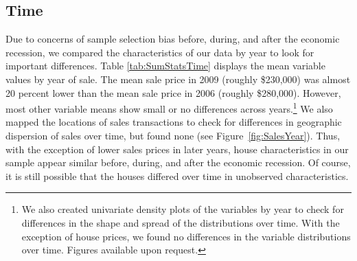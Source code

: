 \documentclass{article}\usepackage[]{graphicx}\usepackage[]{color}
\begin{document}
\subsection*{Time}
Due to concerns of sample selection bias before, during, and after the economic recession, we compared the characteristics of our data by year to look for important differences. Table \ref{tab:SumStatsTime} displays the mean variable values by year of sale. The mean sale price in 2009 (roughly \$230,000) was almost 20 percent lower than the mean sale price in 2006 (roughly \$280,000). However, most other variable means show small or no differences across years.\footnote{We also created univariate density plots of the variables by year to check for differences in the shape and spread of the distributions over time. With the exception of house prices, we found no differences in the variable distributions over time. Figures available upon request.} We also mapped the locations of sales transactions to check for differences in geographic dispersion of sales over time, but found none (see Figure~\ref{fig:SalesYear}). Thus, with the exception of lower sales prices in later years, house characteristics in our sample appear similar before, during, and after the economic recession. Of course, it is still possible that the houses differed over time in unobserved characteristics.
\end{document}
